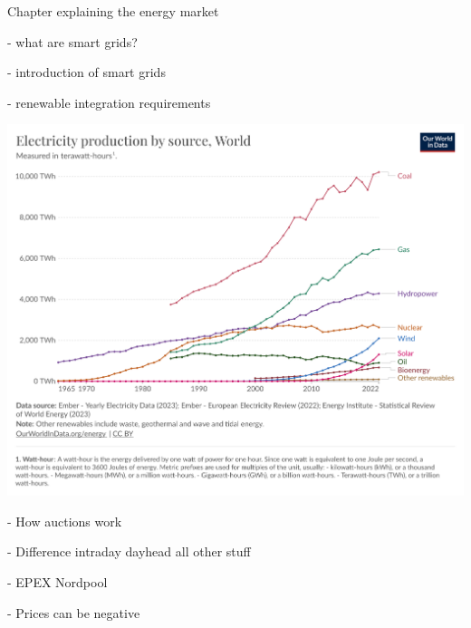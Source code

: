Chapter explaining the energy market

- what are smart grids?

- introduction of smart grids 

- renewable integration requirements

\includegraphics[width=\textwidth]{images/electricity-production-by-source.png}

- How auctions work

- Difference intraday dayhead all other stuff

- EPEX Nordpool

- Prices can be negative
